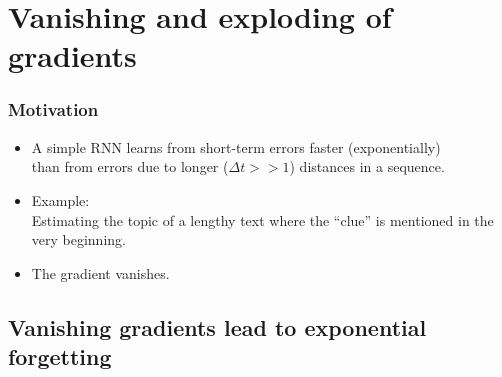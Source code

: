 \section{Vanishing and exploding of gradients}




\begin{frame}\frametitle{Motivation}
	\begin{itemize}
	\setlength\itemsep{1cm}
	\item[]
	A simple RNN learns from short-term errors faster (exponentially)\\
	than from errors due to longer ($\Delta t >\!\!> 1$) distances in a sequence.\\
	
	\item[]Example:\\Estimating the topic of a lengthy text where the ``clue'' is mentioned in the very beginning.\\
	
	\item[]The gradient vanishes.
	\end{itemize}
\end{frame}

\subsection{Vanishing gradients lead to exponential forgetting}

		
